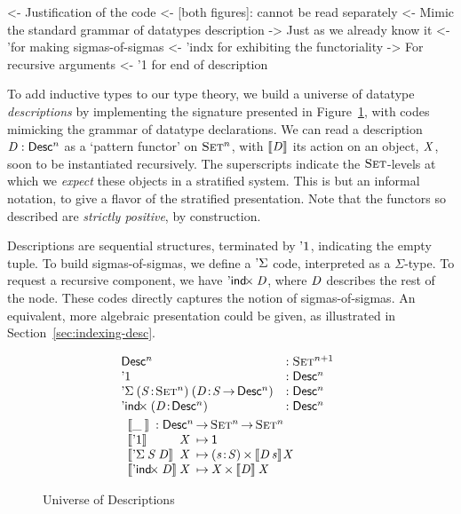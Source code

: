 \begin{wstructure}
<- Justification of the code 
    <- [both figures]: cannot be read separately
    <- Mimic the standard grammar of datatypes description
        -> Just as we already know it
        <- '\Sigma for making sigmas-of-sigmas
        <- 'indx for exhibiting the functoriality
            -> For recursive arguments
        <- '1 for end of description
\end{wstructure}

To add inductive types to our type theory, we build a universe of
datatype \emph{descriptions} by implementing the signature presented
in Figure~\ref{fig:desc_universe}, with codes mimicking the grammar of
datatype declarations. We can read a description $\V{D}:\Desc^{n}$ as
a `pattern functor' on $\Set^{n}$, with $\SYMBdescop{\V{D}}$ its
action on an object, \(\V{X}\), soon to be instantiated
recursively. The superscripts indicate the $\Set$-levels at which we
\emph{expect} these objects in a stratified system. This is but an
informal notation, to give a flavor of the stratified
presentation. Note that the functors so described are \emph{strictly
  positive}, by construction.

Descriptions are sequential structures, terminated by $\DUnit$,
indicating the empty tuple. To build sigmas-of-sigmas, we define a
$\SYMBDSigma$ code, interpreted as a $\Sigma$-type. To request a
recursive component, we have $\DIndx{\V{D}}$, where \(\V{D}\)
describes the rest of the node. These codes directly captures the
notion of sigmas-of-sigmas. An equivalent, more algebraic presentation
could be given, as illustrated in Section~\ref{sec:indexing-desc}.

\begin{figure}
\[\stk{
\begin{array}{@{}ll}
\Desc^n 
    &: \Set^{n+1}\\
\DUnit 
    &: \Desc^{n}\\
\DSigma{(\Bhab{\V{S}}{\Set^{n}})}{(\Bhab{\V{D}}{\V{S} \To \Desc^{n}})} 
    &: \Desc^{n}\\
\DIndx{(\Bhab{\V{D}}{\Desc^{n}})} 
    &: \Desc^{n} \\
\end{array}
\smallskip\\
\begin{array}{l@{\V{X}\:\mapsto\:}l}     
\multicolumn{2}{l}{\descop{\_\:}{} : \Desc^{n} \To \Set^{n} \To \Set^{n}} \\
 \descop{\DUnit}{} &  \Unit \\
 \descop{\DSigma{\V{S}}{\V{D}}}{} &
     \SIGMAS{\Bhab{\V{s}}{\V{S}}}{\descop{\V{D}\,\V{s}}{\!\V{X}}}  \\
\descop{\DIndx{\V{D}}}{}  &  \TIMES{\V{X}}{\descop{\V{D}}{\V{X}}}
\end{array}
}\]

\caption{Universe of Descriptions}
\label{fig:desc_universe}
 
\end{figure}

